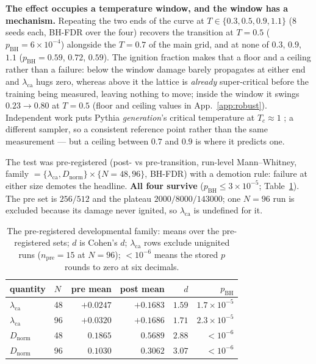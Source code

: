 \documentclass{article}
\newcommand{\dn}{\ensuremath{D_{\mathrm{norm}}}}
\newcommand{\lca}{\ensuremath{\lambda_{\mathrm{ca}}}}
\begin{document}
\textbf{The effect occupies a temperature window, and the window has a mechanism.} Repeating the
two ends of the curve at $T\in\{0.3,0.5,0.9,1.1\}$ (8 seeds each, BH-FDR over the four) recovers
the transition at $T{=}0.5$ ($p_{\mathrm{BH}}{=}6{\times}10^{-4}$) alongside the $T{=}0.7$ of the
main grid, and at none of $0.3$, $0.9$, $1.1$ ($p_{\mathrm{BH}}{=}0.59$, $0.72$, $0.59$). The
ignition fraction makes that a floor and a ceiling rather than a failure: below the window damage
barely propagates at either end and $\lca$ hugs zero, whereas above it the lattice is
\emph{already} super-critical before the training being measured, leaving nothing to move; inside
the window it swings $0.23\to0.80$ at $T{=}0.5$ (floor and ceiling values in
App.~\ref{app:robust}). Independent work puts Pythia \emph{generation}'s critical
temperature at $T_c{\approx}1$ \citep{ar_tempcrit}; a different sampler, so a consistent reference
point rather than the same measurement --- but a ceiling between $0.7$ and $0.9$ is where it
predicts one.

The test was pre-registered (post- vs pre-transition, run-level Mann--Whitney, family
$=\{\lca,\dn\}\times\{N{=}48,96\}$, BH-FDR) with a demotion rule: failure at either size demotes
the headline. \textbf{All four survive} ($p_{\mathrm{BH}}\le3{\times}10^{-5}$; Table~\ref{tab:dev}).
The pre set is $256/512$ and the plateau $2000/8000/143000$; one $N{=}96$ run is excluded because
its damage never ignited, so $\lca$ is undefined for it.

\begin{table}[t]\centering
\caption{The pre-registered developmental family: means over the pre-registered sets; $d$ is
Cohen's $d$; \lca{} rows exclude unignited runs ($n_{\mathrm{pre}}{=}15$ at $N{=}96$);
$<\!10^{-6}$ means the stored $p$ rounds to zero at six decimals.}\label{tab:dev}
\begin{tabular}{llrrrr}\toprule
quantity & $N$ & pre mean & post mean & $d$ & $p_{\mathrm{BH}}$\\\midrule
\lca{} & 48 & $+0.0247$ & $+0.1683$ & $1.59$ & $1.7{\times}10^{-5}$\\
\lca{} & 96 & $+0.0320$ & $+0.1686$ & $1.71$ & $2.3{\times}10^{-5}$\\
\dn{}  & 48 & $0.1865$  & $0.5689$  & $2.88$ & $<\!10^{-6}$\\
\dn{}  & 96 & $0.1030$  & $0.3062$  & $3.07$ & $<\!10^{-6}$\\
\bottomrule\end{tabular}
\end{table}
\end{document}
